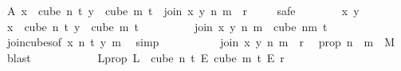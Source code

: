 \begin{isabellebody}
\ A{\isacharcolon}{\kern0pt}\ {\isachardoublequoteopen}{\isasymforall}x\ {\isasymin}\ cube\ n\ {\isacharparenleft}{\kern0pt}t{\isacharplus}{\kern0pt}{}{\isacharparenright}{\kern0pt}{\isachardot}{\kern0pt}\ {\isasymforall}y\ {\isasymin}\ cube\ m\ {\isacharparenleft}{\kern0pt}t{\isacharplus}{\kern0pt}{}{\isacharparenright}{\kern0pt}{\isachardot}{\kern0pt}\ {\isasymchi}\ {\isacharparenleft}{\kern0pt}join\ x\ y\ n\ m{\isacharparenright}{\kern0pt}\ {\isasymin}\ {\isacharbraceleft}{\kern0pt}{\isachardot}{\kern0pt}{\isachardot}{\kern0pt}{\isacharless}{\kern0pt}r{\isacharbraceright}{\kern0pt}{\isachardoublequoteclose}\isanewline
\ \ \ \ \isamarkupfalse%
{\isacharparenleft}{\kern0pt}safe{\isacharparenright}{\kern0pt}\isanewline
\ \ \ \ \ \ \isamarkupfalse%
\ x\ y\isanewline
\ \ \ \ \ \ \isamarkupfalse%
\ {\isachardoublequoteopen}x\ {\isasymin}\ cube\ n\ {\isacharparenleft}{\kern0pt}t{\isacharplus}{\kern0pt}{}{\isacharparenright}{\kern0pt}{\isachardoublequoteclose}\ {\isachardoublequoteopen}y\ {\isasymin}\ cube\ m\ {\isacharparenleft}{\kern0pt}t{\isacharplus}{\kern0pt}{}{\isacharparenright}{\kern0pt}{\isachardoublequoteclose}\isanewline
\ \ \ \ \ \ \isamarkupfalse%
\ \isamarkupfalse%
\ {\isachardoublequoteopen}join\ x\ y\ n\ m\ {\isasymin}\ cube\ {\isacharparenleft}{\kern0pt}n{\isacharplus}{\kern0pt}m{\isacharparenright}{\kern0pt}\ {\isacharparenleft}{\kern0pt}t{\isacharplus}{\kern0pt}{}{\isacharparenright}{\kern0pt}{\isachardoublequoteclose}\ \isamarkupfalse%
\ join{\isacharunderscore}{\kern0pt}cubes{\isacharbrackleft}{\kern0pt}of\ x\ n\ t\ y\ m{\isacharbrackright}{\kern0pt}\ \isamarkupfalse%
\ simp\isanewline
\ \ \ \ \ \ \isamarkupfalse%
\ \isamarkupfalse%
\ {\isachardoublequoteopen}{\isasymchi}\ {\isacharparenleft}{\kern0pt}join\ x\ y\ n\ m{\isacharparenright}{\kern0pt}\ {\isacharless}{\kern0pt}\ r{\isachardoublequoteclose}\ \isamarkupfalse%
\ {\isasymchi}{\isacharunderscore}{\kern0pt}prop\ {\isacartoucheopen}n\ {\isacharplus}{\kern0pt}\ m\ {\isacharequal}{\kern0pt}\ M{\isacharprime}{\kern0pt}{\isacartoucheclose}\ \isamarkupfalse%
\ blast\ \isanewline
\ \ \ \ \isamarkupfalse%
\isanewline
\ \ \ \ \isamarkupfalse%
\ {\isasymchi}L{\isacharunderscore}{\kern0pt}prop{\isacharcolon}{\kern0pt}\ {\isachardoublequoteopen}{\isasymchi}L\ {\isasymin}\ cube\ n\ {\isacharparenleft}{\kern0pt}t{\isacharplus}{\kern0pt}{}{\isacharparenright}{\kern0pt}\ {\isasymrightarrow}\isactrlsub E\ cube\ m\ {\isacharparenleft}{\kern0pt}t{\isacharplus}{\kern0pt}{}{\isacharparenright}{\kern0pt}\ {\isasymrightarrow}\isactrlsub E\ {\isacharbraceleft}{\kern0pt}{\isachardot}{\kern0pt}{\isachardot}{\kern0pt}{\isacharless}{\kern0pt}r{\isacharbraceright}{\kern0pt}{\isachardoublequoteclose}\ \isamarkupfalse%

\end{isabellebody}
